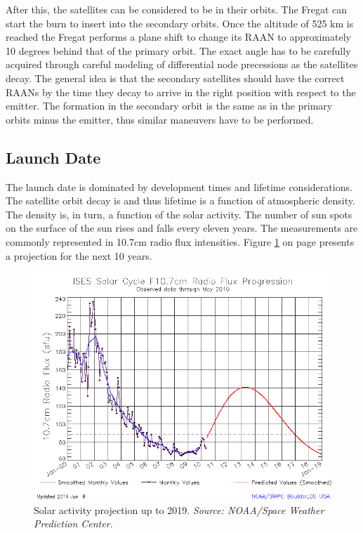 After this, the satellites can be considered to be in their orbits. The Fregat can start the burn to insert into the secondary orbits. Once the altitude of 525 km is reached the Fregat performs a plane shift to change its \ac{RAAN} to approximately 10 degrees behind that of the primary orbit. The exact angle has to be carefully acquired through careful modeling of differential node precessions as the satellites decay. The general idea is that the secondary satellites should have the correct RAANs by the time they decay to arrive in the right position with respect to the emitter.  The formation in the secondary orbit is the same as in the primary orbits minus the emitter, thus similar maneuvers have to be performed.

\subsection{Launch Date}
\label{frLSLD}

The launch date is dominated by development times and lifetime considerations. The satellite orbit decay is and thus lifetime is a function of atmospheric density. The density is, in turn, a function of the solar activity. The number of sun spots on the surface of the sun rises and falls every eleven years. The measurements are commonly represented in 10.7cm radio flux intensities. Figure \ref{fig:f10.7} on page \pageref{fig:f10.7} presents a projection for the next 10 years.

\begin{figure}[!h]
\centering
\includegraphics[width=1.0\textwidth, angle=0]{chapters/img/solarCycle.png}
\caption{Solar activity projection up to 2019. \emph{Source: NOAA/Space Weather Prediction Center.} }
\label{fig:f10.7}
\end{figure}

